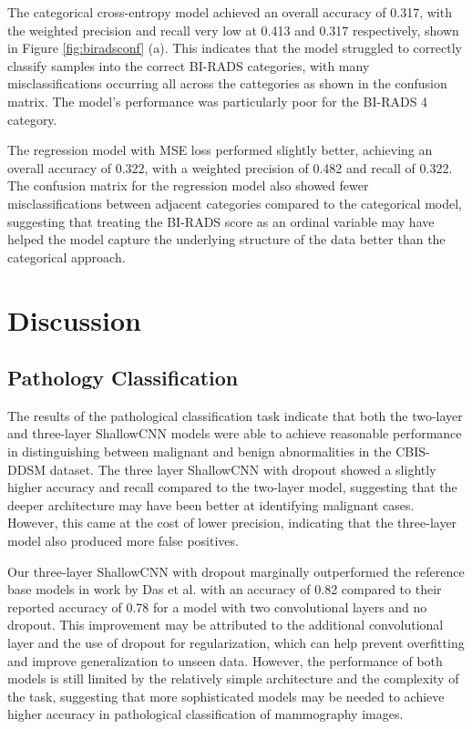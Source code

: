 \documentclass[12pt]{article}
\begin{document}
\noindent
The categorical cross-entropy model achieved an overall accuracy of 0.317, with the weighted precision and recall very low at 0.413 and 0.317 respectively, shown in Figure \ref{fig:biradsconf} (a). This indicates that the model struggled to correctly classify samples into the correct BI-RADS categories, with many misclassifications occurring all across the cattegories as shown in the confusion matrix. The model's performance was particularly poor for the BI-RADS 4 category.

\medskip \noindent
The regression model with MSE loss performed slightly better, achieving an overall accuracy of 0.322, with a weighted precision of 0.482 and recall of 0.322. The confusion matrix for the regression model also showed fewer misclassifications between adjacent categories compared to the categorical model, suggesting that treating the BI-RADS score as an ordinal variable may have helped the model capture the underlying structure of the data better than the categorical approach.






\section{Discussion}

\subsection{Pathology Classification}
The results of the pathological classification task indicate that both the two-layer and three-layer ShallowCNN models were able to achieve reasonable performance in distinguishing between malignant and benign abnormalities in the CBIS-DDSM dataset. The three layer ShallowCNN with dropout showed a slightly higher accuracy and recall compared to the two-layer model, suggesting that the deeper architecture may have been better at identifying malignant cases. However, this came at the cost of lower precision, indicating that the three-layer model also produced more false positives. 

\medskip \noindent
Our three-layer ShallowCNN with dropout marginally outperformed the reference base models in work by Das et al. \cite{ref:example2} with an accuracy of 0.82 compared to their reported accuracy of 0.78 for a model with two convolutional layers and no dropout. This improvement may be attributed to the additional convolutional layer and the use of dropout for regularization, which can help prevent overfitting and improve generalization to unseen data. However, the performance of both models is still limited by the relatively simple architecture and the complexity of the task, suggesting that more sophisticated models may be needed to achieve higher accuracy in pathological classification of mammography images.
\end{document}

